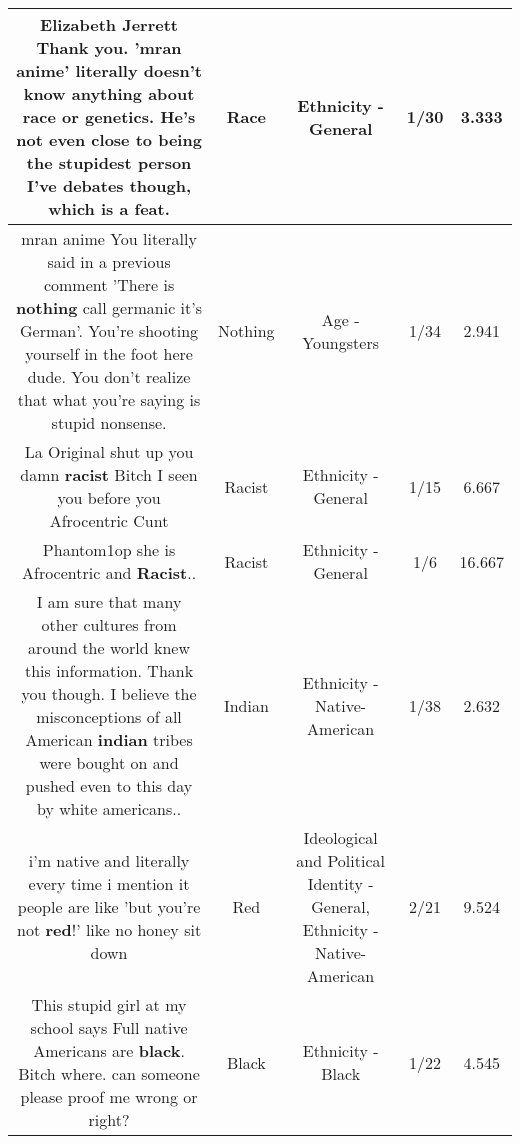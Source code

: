 \documentclass[11pt]{article}
\newlength\mylength
\begin{document}
\begin{center}
\begin{longtable}{|C{.65\mylength}|C{.30\mylength}|C{.12\mylength}|C{.12\mylength}|C{.12\mylength}|}
  \small Elizabeth Jerrett Thank you. 'mran anime' literally doesn't know anything about \textbf{race} or genetics. He's not even close to being the stupidest person I've debates though, which is a feat.\normalsize   & Race & Ethnicity - General & 1/30 & 3.333 \\  \hline
  \small mran anime You literally said in a previous comment 'There is \textbf{nothing} call germanic it's German'. You're shooting yourself in the foot here dude. You don't realize that what you're saying is stupid nonsense.\normalsize   & Nothing & Age - Youngsters & 1/34 & 2.941 \\  \hline
  \small La Original shut up you damn \textbf{racist} Bitch I seen you before you Afrocentric Cunt\normalsize   & Racist & Ethnicity - General & 1/15 & 6.667 \\  \hline
  \small Phantom1op she is Afrocentric and \textbf{Racist}..\normalsize   & Racist & Ethnicity - General & 1/6 & 16.667 \\  \hline
  \small I am sure that many other cultures  from around the world knew this information. Thank you though. I believe the misconceptions of all American \textbf{indian} tribes were bought on and pushed even to this day by white americans..\normalsize   & Indian & Ethnicity - Native-American & 1/38 & 2.632 \\  \hline
  \small i'm native and literally every time i mention it people are like 'but you're not \textbf{r\textbf{ed}}!' like no honey sit down\normalsize   & Red &  Ideological and Political Identity - General, Ethnicity - Native-American & 2/21 & 9.524 \\  \hline
  \small This stupid girl at my school says Full native Americans are \textbf{black}.  Bitch where.  can someone please proof me wrong or right?\normalsize   & Black & Ethnicity - Black & 1/22 & 4.545 \\  \hline

\end{longtable}
\end{center}
\end{document}
